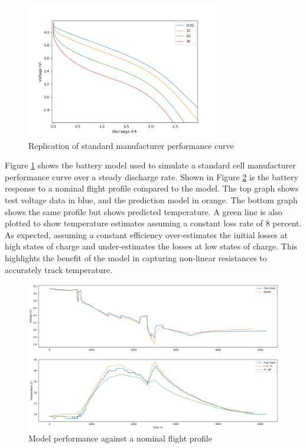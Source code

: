 \documentclass[]{aiaa-tc}%
\begin{document}
\begin{figure}[!htb]
	\centering
	\includegraphics[width=0.75\textwidth]{figures/curve.png}
	\caption{Replication of standard manufacturer performance curve}
	\label{fig:curve}
\end{figure}

Figure \ref{fig:curve} shows the battery model used to simulate a standard cell manufacturer performance curve over a steady discharge rate. Shown in Figure \ref{fig:L1_004} is the battery response to a nominal flight profile compared to the model. The top graph shows test voltage data in blue, and the prediction model in orange. The bottom graph shows the same profile but shows predicted temperature. A green line is also plotted to show temperature estimates assuming a constant loss rate of 8 percent. As expected, assuming a constant efficiency over-estimates the initial losses at high states of charge and under-estimates the losses at low states of charge. This highlights the benefit of the model in capturing non-linear resistances to accurately track temperature.

\begin{figure}[!htb]
	\centering
	\includegraphics[width=1.0\textwidth]{figures/x57_L1_004.png}
	\caption{Model performance against a nominal flight profile}
	\label{fig:L1_004}
\end{figure}
\end{document}
